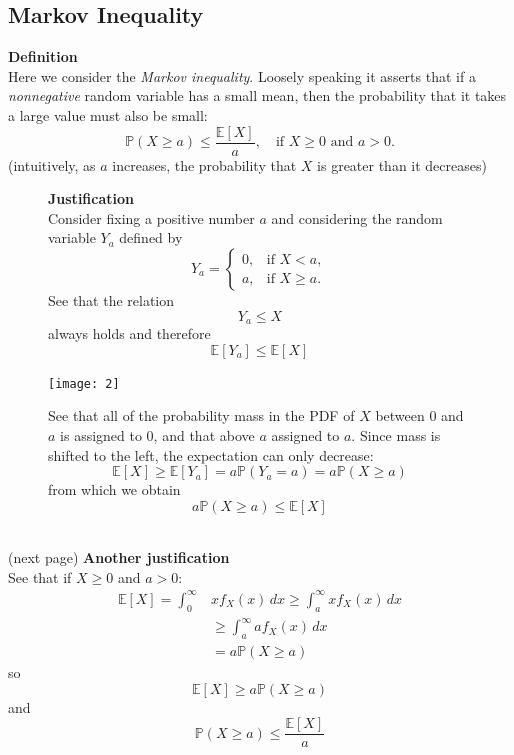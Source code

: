 \documentclass{report}
\begin{document}
\subsection{Markov Inequality}
\textbf{Definition}\\
Here we consider the \textit{Markov inequality}. Loosely speaking it asserts that
if a \textit{nonnegative} random variable has a small mean, then the probability that it takes a large value must
also be small:
\begin{equation*}
\boxed{\mathbb{P}(X\geq a)\leq\frac{\mathbb{E}[X]}{a},\quad\text{if $X\geq0$ and $a>0$.}}
\end{equation*}
(intuitively, as $a$ increases, the probability that $X$ is greater than it decreases)
\begin{figure}[h]
\textbf{Justification}\\
Consider fixing a positive number $a$ and considering the random variable $Y_a$ defined by
\begin{equation*}
Y_a=\begin{cases}
0,&\text{if }X<a,\\
a,&\text{if }X\geq a.
\end{cases}
\end{equation*}
See that the relation 
\begin{equation*}
Y_a\leq X
\end{equation*}
always holds and therefore
\begin{equation*}
\mathbb{E}[Y_a]\leq\mathbb{E}[X]
\end{equation*}
\begin{center}
\texttt{[image: 2]}\\
\end{center}
See that all of the probability mass in the PDF of $X$ between 0 and $a$ is assigned to 0, and that above $a$
assigned to $a$. Since mass is shifted to the left, the expectation can only decrease:
\begin{equation*}
\mathbb{E}[X]\geq\mathbb{E}[Y_a]=a\mathbb{P}(Y_a=a)
=a\mathbb{P}(X\geq a)
\end{equation*}
from which we obtain
\begin{equation*}
a\mathbb{P}(X\geq a)
\leq\mathbb{E}[X]
\end{equation*}
\end{figure}\\
(next page)
\newpage
\noindent\textbf{Another justification}\\
See that if $X\geq0$ and $a>0$:
\begin{align*}
\mathbb{E}[X]=\int^\infty_0&xf_X(x)\,dx\geq\int^\infty_axf_X(x)\,dx\\
&\geq\int^\infty_aaf_X(x)\,dx\\
&=a\mathbb{P}(X\geq a)
\end{align*}
so
\begin{equation*}
\mathbb{E}[X]\geq a\mathbb{P}(X\geq a)
\end{equation*}
and
\begin{equation*}
\mathbb{P}(X\geq a)\leq\frac{\mathbb{E}[X]}{a}
\end{equation*}
\newpage
\end{document}
